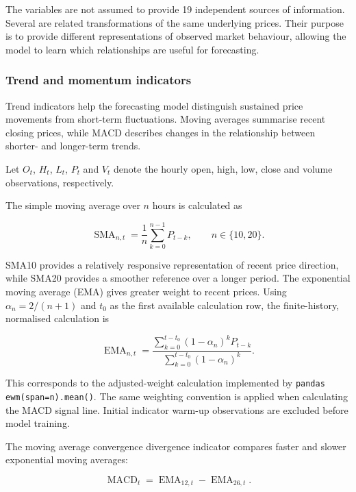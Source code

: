 The variables are not assumed to provide 19 independent sources of information. Several are related transformations of the same underlying prices. Their purpose is to provide different representations of observed market behaviour, allowing the model to learn which relationships are useful for forecasting.

\subsubsection{Trend and momentum indicators}

Trend indicators help the forecasting model distinguish sustained price movements from short-term fluctuations. Moving averages summarise recent closing prices, while MACD describes changes in the relationship between shorter- and longer-term trends.

Let $O_t$, $H_t$, $L_t$, $P_t$ and $V_t$ denote the hourly open, high, low, close and volume observations, respectively.

The simple moving average over $n$ hours is calculated as

\begin{equation}
\operatorname{SMA}_{n,t}
=
\frac{1}{n}
\sum_{k=0}^{n-1}P_{t-k},
\qquad n\in\{10,20\}.
\label{eq:sma}
\end{equation}

SMA10 provides a relatively responsive representation of recent price direction, while SMA20 provides a smoother reference over a longer period. The exponential moving average (EMA) gives greater weight to recent prices. Using $\alpha_n=2/(n+1)$ and $t_0$ as the first available calculation row, the finite-history, normalised calculation is

\begin{equation}
\operatorname{EMA}_{n,t}
=
\frac{
\sum_{k=0}^{t-t_0}(1-\alpha_n)^kP_{t-k}
}{
\sum_{k=0}^{t-t_0}(1-\alpha_n)^k
}.
\label{eq:ema}
\end{equation}

This corresponds to the adjusted-weight calculation implemented by \texttt{pandas ewm(span=n).mean()}. The same weighting convention is applied when calculating the MACD signal line. Initial indicator warm-up observations are excluded before model training.

The moving average convergence divergence indicator compares faster and slower exponential moving averages:

\begin{equation}
\operatorname{MACD}_t
=
\operatorname{EMA}_{12,t}
-
\operatorname{EMA}_{26,t}.
\label{eq:macd}
\end{equation}

